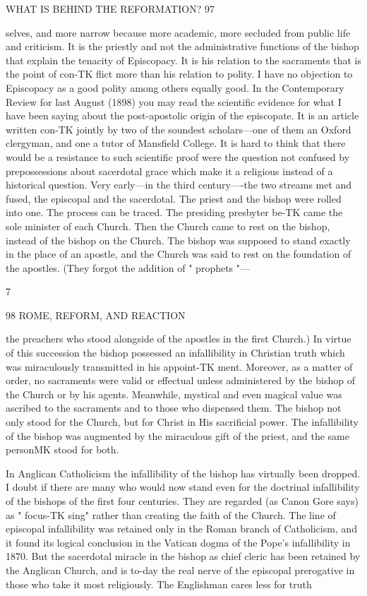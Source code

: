 \documentclass[12pt,a5paper,twoside]{book}
\begin{document}
WHAT IS BEHIND THE REFORMATION? 97 

selves, and more narrow because more academic, more 
secluded from public life and criticism. It is the 
priestly and not the administrative functions of the 
bishop that explain the tenacity of Episcopacy. It is 
his relation to the sacraments that is the point of con-TK
flict more than his relation to polity. I have no 
objection to Episcopacy as a good polity among others 
equally good. In the Contemporary Review for last 
August (1898) you may read the scientific evidence 
for what I have been saying about the post-apostolic 
origin of the episcopate. It is an article written con-TK
jointly by two of the soundest scholars---one of them 
an Oxford clergyman, and one a tutor of Mansfield 
College. It is hard to think that there would be a 
resistance to such scientific proof were the question not 
confused by prepossessions about sacerdotal grace which 
make it a religious instead of a historical question. 
Very early---in the third century----the two streams 
met and fused, the episcopal and the sacerdotal. The 
priest and the bishop were rolled into one. The 
process can be traced. The presiding presbyter be-TK
came the sole minister of each Church. Then the 
Church came to rest on the bishop, instead of the 
bishop on the Church. The bishop was supposed to 
stand exactly in the place of an apostle, and the 
Church was said to rest on the foundation of the 
apostles. (They forgot the addition of " prophets "---

7 



98 ROME, REFORM, AND REACTION 

the preachers who stood alongside of the apostles in 
the first Church.) In virtue of this succession the 
bishop possessed an infallibility in Christian truth 
which was miraculously transmitted in his appoint-TK
ment. Moreover, as a matter of order, no sacraments 
were valid or effectual unless administered by the 
bishop of the Church or by his agents. Meanwhile, 
mystical and even magical value was ascribed to the 
sacraments and to those who dispensed them. The 
bishop not only stood for the Church, but for Christ 
in His sacrificial power. The infallibility of the 
bishop was augmented by the miraculous gift of the 
priest, and the same personMK stood for both. 

In Anglican Catholicism the infallibility of the 
bishop has virtually been dropped. I doubt if there 
are many who would now stand even for the doctrinal 
infallibility of the bishops of the first four centuries. 
They are regarded (as Canon Gore says) as " focus-TK
sing" rather than creating the faith of the Church. 
The line of episcopal infallibility was retained only 
in the Roman branch of Catholicism, and it found 
its logical conclusion in the Vatican dogma of the 
Pope's infallibility in 1870. But the sacerdotal 
miracle in the bishop as chief cleric has been retained 
by the Anglican Church, and is to-day the real nerve 
of the episcopal prerogative in those who take it most 
religiously. The Englishman cares less for truth 
\end{document}
